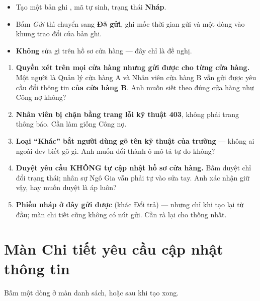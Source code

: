 \mghi

\begin{itemize}[leftmargin=*]
  \item Tạo một bản ghi , mã tự sinh, trạng thái \textbf{Nháp}.
  \item Bấm \emph{Gửi} thì chuyển sang \textbf{Đã gửi}, ghi mốc thời gian gửi và một dòng vào
        khung trao đổi của bản ghi.
  \item \textbf{Không} sửa gì trên hồ sơ cửa hàng --- đây chỉ là đề nghị.
\end{itemize}

\mhoi

\begin{ask}
\begin{enumerate}[leftmargin=*]
  \item \textbf{Quyền xét trên mọi cửa hàng nhưng gửi được cho từng cửa hàng.} Một người là
        Quản lý cửa hàng A và Nhân viên cửa hàng B vẫn gửi được yêu cầu đổi thông tin
        \textbf{của cửa hàng B}. Anh muốn siết theo đúng cửa hàng như Công nợ không?
  \item \textbf{Nhân viên bị chặn bằng trang lỗi kỹ thuật 403}, không phải trang thông báo.
        Cần làm giống Công nợ.
  \item \textbf{Loại ``Khác'' bắt người dùng gõ tên kỹ thuật của trường} --- không ai ngoài dev
        biết gõ gì. Anh muốn đổi thành ô mô tả tự do không?
  \item \textbf{Duyệt yêu cầu KHÔNG tự cập nhật hồ sơ cửa hàng.} Bấm duyệt chỉ đổi trạng thái;
        nhân sự Ngô Gia vẫn phải tự vào sửa tay. Anh xác nhận giữ vậy, hay muốn duyệt là áp
        luôn?
  \item \textbf{Phiếu nháp ở đây gửi được} (khác Đổi trả) --- nhưng chỉ khi tạo lại từ đầu; màn
        chi tiết cũng không có nút gửi. Cần rà lại cho thống nhất.
\end{enumerate}
\end{ask}

\section{Màn Chi tiết yêu cầu cập nhật thông tin}
\medskip

\mvao

Bấm một dòng ở màn danh sách, hoặc sau khi tạo xong.

\mai


